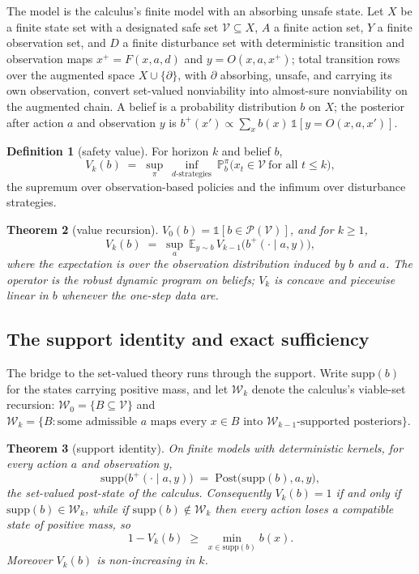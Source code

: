 \documentclass[10pt,twocolumn]{article}
\theoremstyle{plain}
\newtheorem{theorem}{Theorem}
\theoremstyle{definition}
\newtheorem{definition}[theorem]{Definition}
\theoremstyle{remark}
\begin{document}
The model is the calculus's finite model with an absorbing unsafe state.
Let \(X\) be a finite state set with a designated safe set
\(\mathcal{V} \subseteq X\), \(A\) a finite action set, \(Y\) a finite
observation set, and \(D\) a finite disturbance set with
deterministic transition and observation maps
\(x^{+} = F(x, a, d)\) and \(y = O(x, a, x^{+})\); total transition
rows over the augmented space \(X \cup \{\partial\}\), with \(\partial\)
absorbing, unsafe, and carrying its own observation, convert set-valued
nonviability into almost-sure nonviability on the augmented chain. A
belief is a probability distribution \(b\) on \(X\); the posterior after
action \(a\) and observation \(y\) is
\(b^{+}(x') \propto \sum_{x} b(x)\,\mathbb{1}[y = O(x, a, x')]\).

\begin{definition}[safety value]\label{def:value}
For horizon \(k\) and belief \(b\),
\[
V_{k}(b) \;=\; \sup_{\pi}\ \inf_{d\text{-strategies}}\
\mathbb{P}_{b}^{\pi}\bigl(x_{t} \in \mathcal{V}\ \text{for all } t \le k\bigr),
\]
the supremum over observation-based policies and the infimum over
disturbance strategies.
\end{definition}

\begin{theorem}[value recursion]\label{thm:recursion}
\(V_{0}(b) = \mathbb{1}[b \in \mathcal{P}(\mathcal{V})]\), and for
\(k \ge 1\),
\[
V_{k}(b) \;=\; \sup_{a}\ \mathbb{E}_{y \sim b}\,
V_{k-1}\bigl(b^{+}(\cdot \mid a, y)\bigr),
\]
where the expectation is over the observation distribution induced by
\(b\) and \(a\). The operator is the robust dynamic program on beliefs;
\(V_{k}\) is concave and piecewise linear in \(b\) whenever the
one-step data are.
\end{theorem}

\subsection{The support identity and exact sufficiency}\label{support}

The bridge to the set-valued theory runs through the support. Write
\(\mathrm{supp}(b)\) for the states carrying positive mass, and let
\(\mathcal{W}_{k}\) denote the calculus's viable-set recursion:
\(\mathcal{W}_{0} = \{B \subseteq \mathcal{V}\}\) and
\(\mathcal{W}_{k} = \{B : \text{some admissible } a \text{ maps every }
x \in B \text{ into } \mathcal{W}_{k-1}\text{-supported posteriors}\}\).

\begin{theorem}[support identity]\label{thm:support}
On finite models with deterministic kernels, for every action \(a\) and
observation \(y\),
\[
\mathrm{supp}\bigl(b^{+}(\cdot \mid a, y)\bigr)
\;=\; \mathrm{Post}\bigl(\mathrm{supp}(b), a, y\bigr),
\]
the set-valued post-state of the calculus. Consequently
\(V_{k}(b) = 1\) if and only if
\(\mathrm{supp}(b) \in \mathcal{W}_{k}\), while if
\(\mathrm{supp}(b) \notin \mathcal{W}_{k}\) then every action loses a
compatible state of positive mass, so
\[
1 - V_{k}(b) \;\ge\; \min_{x \in \mathrm{supp}(b)} b(x).
\]
Moreover \(V_{k}(b)\) is non-increasing in \(k\).
\end{theorem}
\end{document}
